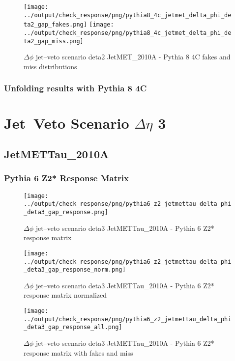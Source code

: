 \documentclass[11pt]{book}
\begin{document}
\begin{figure}[ht]
\centering
\texttt{[image: ../output/check\_response/png/pythia8\_4c\_jetmet\_delta\_phi\_deta2\_gap\_fakes.png]}
\texttt{[image: ../output/check\_response/png/pythia8\_4c\_jetmet\_delta\_phi\_deta2\_gap\_miss.png]}
\caption{$\Delta\phi$ jet--veto scenario deta2 JetMET\_2010A - Pythia 8 4C fakes and miss distributions}
\label{p8_jetmet_delta_phi_deta2_gap_fakesmiss}
\end{figure}


\clearpage
\subsection{Unfolding results with Pythia 8 4C}


\newpage
\chapter{Jet--Veto Scenario $\Delta\eta$ 3}
\section{JetMETTau\_2010A}
\subsection{Pythia 6 Z2* Response Matrix}

\begin{figure}[ht]
\centering
\texttt{[image: ../output/check\_response/png/pythia6\_z2\_jetmettau\_delta\_phi\_deta3\_gap\_response.png]}
\caption{$\Delta\phi$ jet--veto scenario deta3 JetMETTau\_2010A - Pythia 6 Z2* response matrix}
\label{p6_jetmettau_delta_phi_deta3_gap_response}
\end{figure}

\begin{figure}[ht]
\centering
\texttt{[image: ../output/check\_response/png/pythia6\_z2\_jetmettau\_delta\_phi\_deta3\_gap\_response\_norm.png]}
\caption{$\Delta\phi$ jet--veto scenario deta3 JetMETTau\_2010A - Pythia 6 Z2* response matrix normalized}
\label{p6_jetmettau_delta_phi_deta3_gap_response_norm}
\end{figure}

\begin{figure}[ht]
\centering
\texttt{[image: ../output/check\_response/png/pythia6\_z2\_jetmettau\_delta\_phi\_deta3\_gap\_response\_all.png]}
\caption{$\Delta\phi$ jet--veto scenario deta3 JetMETTau\_2010A - Pythia 6 Z2* response matrix with fakes and miss}
\label{p6_jetmettau_delta_phi_deta3_gap_response_all}
\end{figure}
\end{document}
